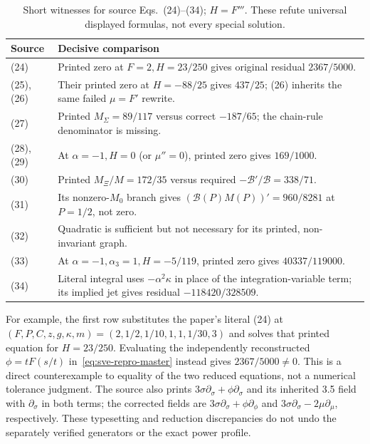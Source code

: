 \documentclass[11pt]{article}
\theoremstyle{definition}
\begin{document}
\begin{table}[ht]
\centering\small
\begin{tabularx}{\linewidth}{@{}p{1.35cm}X@{}}
\toprule
Source & Decisive comparison\\
\midrule
(24) & Printed zero at $F=2,H=23/250$ gives original residual $2367/5000$.\\
(25), (26) & Their printed zero at $H=-88/25$ gives $437/25$; (26) inherits the same failed $\mu=F'$ rewrite.\\
(27) & Printed $M_\Sigma=89/117$ versus correct $-187/65$; the chain-rule denominator is missing.\\
(28), (29) & At $\alpha=-1,H=0$ (or $\mu''=0$), printed zero gives $169/1000$.\\
(30) & Printed $M_\Xi/M=172/35$ versus required $-\mathcal B'/\mathcal B=338/71$.\\
(31) & Its nonzero-$M_0$ branch gives $(\mathcal B(P)M(P))'=960/8281$ at $P=1/2$, not zero.\\
(32) & Quadratic is sufficient but not necessary for its printed, non-invariant graph.\\
(33) & At $\alpha=-1,\alpha_3=1,H=-5/119$, printed zero gives $40337/119000$.\\
(34) & Literal integral uses $-\alpha^2\kappa$ in place of the integration-variable term; its implied jet gives residual $-118420/328509$.\\
\bottomrule
\end{tabularx}
\caption{Short witnesses for source Eqs.~(24)--(34); $H=F'''$. These refute universal displayed formulas, not every special solution.}
\label{tab:sve-repro-source-errors}
\end{table}

For example, the first row substitutes the paper's literal (24) at
$(F,P,C,z,g,\kappa,m)=(2,1/2,1/10,1,1,1/30,3)$ and solves that
printed equation for $H=23/250$. Evaluating the independently reconstructed
$\phi=tF(s/t)$ in~\eqref{eq:sve-repro-master} instead gives
$2367/5000\ne0$. This is a direct counterexample to equality of the two
reduced equations, not a numerical tolerance judgment. The source also
prints $3\sigma\partial_\sigma+\phi\partial_\sigma$ and its inherited
3.5 field with $\partial_\sigma$ in both terms; the corrected fields are
$3\sigma\partial_\sigma+\phi\partial_\phi$ and
$3\sigma\partial_\sigma-2\mu\partial_\mu$, respectively.
These typesetting and reduction discrepancies do not undo the separately
verified generators or the exact power profile.
\end{document}
